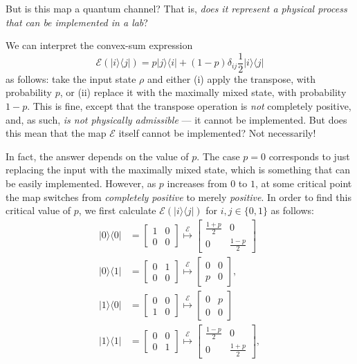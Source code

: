 \documentclass[fleqn]{article}
\begin{document}
But is this map a quantum channel?
That is, \emph{does it represent a physical process that can be implemented in a lab}?

We can interpret the convex-sum expression
\[
  \mathcal{E}(|i\rangle\langle j|)
  = p|j\rangle\langle i|+(1-p)\delta_{ij} \frac{1}{2}|i\rangle\langle j|
\]
as follows: take the input state \(\rho\) and either (i) apply the transpose, with probability \(p\), or (ii) replace it with the maximally mixed state, with probability \(1-p\).
This is fine, except that the transpose operation is \emph{not} completely positive, and, as such, \emph{is not physically admissible} --- it cannot be implemented.
But does this mean that the map \(\mathcal{E}\) itself cannot be implemented?
Not necessarily!

In fact, the answer depends on the value of \(p\).
The case \(p=0\) corresponds to just replacing the input with the maximally mixed state, which is something that can be easily implemented.
However, as \(p\) increases from \(0\) to \(1\), at some critical point the map switches from \emph{completely positive} to merely \emph{positive}.
In order to find this critical value of \(p\), we first calculate \(\mathcal{E} (|i\rangle\langle j|)\) for \(i,j\in\{0,1\}\) as follows:
\[
  \begin{aligned}
    |0\rangle\langle 0|
    &= \begin{bmatrix}1&0\\0&0\end{bmatrix}
    \overset{\mathcal{E}}{\longmapsto}
    \begin{bmatrix}\frac{1+p}{2}&0\\0&\frac{1-p}{2}\end{bmatrix}
  \\|0\rangle\langle 1|
    &= \begin{bmatrix}0&1\\0&0\end{bmatrix}
    \overset{\mathcal{E}}{\longmapsto}
    \begin{bmatrix}0&0\\p&0\end{bmatrix},
  \\|1\rangle\langle 0|
    &= \begin{bmatrix}0&0\\1&0\end{bmatrix}
    \overset{\mathcal{E}}{\longmapsto}
    \begin{bmatrix}0&p\\0&0\end{bmatrix}
  \\|1\rangle\langle 1|
    &= \begin{bmatrix}0&0\\0&1\end{bmatrix}
    \overset{\mathcal{E}}{\longmapsto}
    \begin{bmatrix}\frac{1-p}{2}&0\\0&\frac{1+p}{2}\end{bmatrix},
  \end{aligned}
\]
\end{document}
